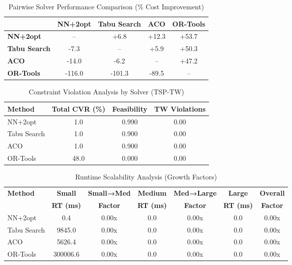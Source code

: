 
\begin{table}[ht]
\centering
\caption{Pairwise Solver Performance Comparison (\% Cost Improvement)}
\label{tab:pairwise_comparison}
\begin{tabular}{lcccc}
\toprule
 & \textbf{NN+2opt} & \textbf{Tabu Search} & \textbf{ACO} & \textbf{OR-Tools} \\
\midrule
\textbf{NN+2opt} & -- & +6.8 & +12.3 & +53.7 \\
\textbf{Tabu Search} & -7.3 & -- & +5.9 & +50.3 \\
\textbf{ACO} & -14.0 & -6.2 & -- & +47.2 \\
\textbf{OR-Tools} & -116.0 & -101.3 & -89.5 & -- \\
\bottomrule
\end{tabular}
\end{table}

\begin{table}[ht]
\centering
\caption{Constraint Violation Analysis by Solver (TSP-TW)}
\label{tab:constraint_violations}
\begin{tabular}{lccc}
\toprule
\textbf{Method} & \textbf{Total CVR (\%)} & \textbf{Feasibility} & \textbf{TW Violations} \\
\midrule
NN+2opt & 1.0 & 0.990 & 0.00 \\
Tabu Search & 1.0 & 0.900 & 0.00 \\
ACO & 1.0 & 0.900 & 0.00 \\
OR-Tools & 48.0 & 0.000 & 0.00 \\
\bottomrule
\end{tabular}
\end{table}


\begin{table}[ht]
\centering
\caption{Runtime Scalability Analysis (Growth Factors)}
\label{tab:runtime_scalability}
\begin{tabular}{lcccccc}
\toprule
\textbf{Method} & \textbf{Small} & \textbf{Small→Med} & \textbf{Medium} & \textbf{Med→Large} & \textbf{Large} & \textbf{Overall} \\
\textbf{} & \textbf{RT (ms)} & \textbf{Factor} & \textbf{RT (ms)} & \textbf{Factor} & \textbf{RT (ms)} & \textbf{Factor} \\
\midrule
NN+2opt & 0.4 & 0.00x & 0.0 & 0.00x & 0.0 & 0.00x \\
Tabu Search & 9845.0 & 0.00x & 0.0 & 0.00x & 0.0 & 0.00x \\
ACO & 5626.4 & 0.00x & 0.0 & 0.00x & 0.0 & 0.00x \\
OR-Tools & 300006.6 & 0.00x & 0.0 & 0.00x & 0.0 & 0.00x \\
\bottomrule
\end{tabular}
\end{table}

